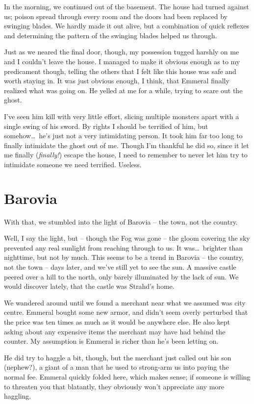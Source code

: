 
In the morning, we continued out of the basement. The house had turned against us; poison spread through every room and the doors had been replaced by swinging blades. We hardly made it out alive, but a combination of quick reflexes and determining the pattern of the swinging blades helped us through.

Just as we neared the final door, though, my possession tugged harshly on me and I couldn't leave the house. I managed to make it obvious enough as to my predicament though, telling the others that I felt like this house was safe and worth staying in. It was just obvious enough, I think, that Emmeral finally realized what was going on. He yelled at me for a while, trying to scare out the ghost.

I've seen him kill with very little effort, slicing multiple monsters apart with a single swing of his sword. By rights I should be terrified of him, but somehow\dots\ he's just not a very intimidating person. It took him far too long to finally intimidate the ghost out of me. Though I'm thankful he did so, since it let me finally (\emph{finally!}) escape the house, I need to remember to never let him try to intimidate someone we need terrified. Useless.

\section*{Barovia}
With that, we stumbled into the light of Barovia -- the town, not the country.

Well, I say the light, but -- though the Fog was gone -- the gloom covering the sky prevented any real sunlight from reaching through to us. It was\dots\ brighter than nighttime, but not by much. This seems to be a trend in Barovia -- the country, not the town -- days later, and we've still yet to see the sun. A massive castle peered over a hill to the north, only barely illuminated by the lack of sun. We would discover lately, that the castle was Strahd's home.

We wandered around until we found a merchant near what we assumed was city centre. Emmeral bought some new armor, and didn't seem overly perturbed that the price was ten times as much as it would be anywhere else. He also kept asking about any expensive items the merchant may have had behind the counter. My assumption is Emmeral is richer than he's been letting on.

He did try to haggle a bit, though, but the merchant just called out his son (nephew?), a giant of a man that he used to strong-arm us into paying the normal fee. Emmeral quickly folded here, which makes sense; if someone is willing to threaten you that blatantly, they obviously won't appreciate any more haggling.

